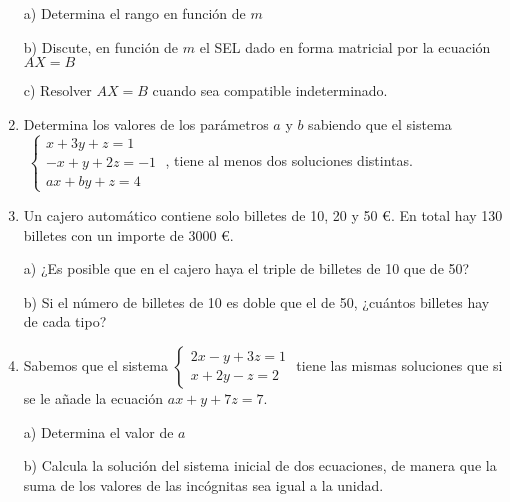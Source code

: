 \begin{enumerate}
a) Determina el rango en función de $m$

b) Discute, en función de $m$ el SEL dado en forma matricial por la ecuación $AX=B$

c) Resolver $AX=B$ cuando sea compatible indeterminado.




\item Determina los valores de los parámetros $a$ y $b$ sabiendo que el sistema $\; \begin{cases} x+3y+z=1\\-x+y+2z=-1\\ax+by+z=4 \end{cases}\; $, tiene al menos dos soluciones distintas. 


\item Un cajero automático contiene solo billetes de 10, 20 y 50 €. En total hay 130 billetes con un importe de 3000 €.

a) ¿Es posible que en el cajero haya el triple de billetes de 10 que de 50?

b) Si el número de billetes de 10 es doble que el de 50, ¿cuántos billetes hay de cada tipo?


\item Sabemos que el sistema $\begin{cases} 2x-y+3z=1\\x+2y-z=2 \end{cases}$ tiene las mismas soluciones que si se le añade la ecuación $ax+y+7z=7$.

a) Determina el valor de $a$

b) Calcula la solución del sistema inicial de dos ecuaciones, de manera que la suma de los valores de las incógnitas sea igual a la unidad.


\end{enumerate}
